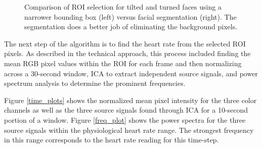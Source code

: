 \documentclass[10pt,twocolumn,letterpaper]{article}
\begin{document}
\begin{figure}
\begin{center}
\end{center}
\caption{Comparison of ROI selection for tilted and turned faces using a narrower bounding box (left) versus facial segmentation (right). The segmentation does a better job of eliminating the background pixels.}
\label{tilt_turn}
\end{figure}

The next step of the algorithm is to find the heart rate from the selected ROI pixels. As described in the technical approach, this process included finding the mean RGB pixel values within the ROI for each frame and then normalizing across a 30-second window, ICA to extract independent source signals, and power spectrum analysis to determine the prominent frequencies.

Figure \ref{time_plots} shows the normalized mean pixel intensity for the three color channels as well as the three source signals found through ICA for a 10-second portion of a window. Figure \ref{freq_plot} shows the power spectra for the three source signals within the physiological heart rate range. The strongest frequency in this range corresponds to the heart rate reading for this time-step.
\end{document}
